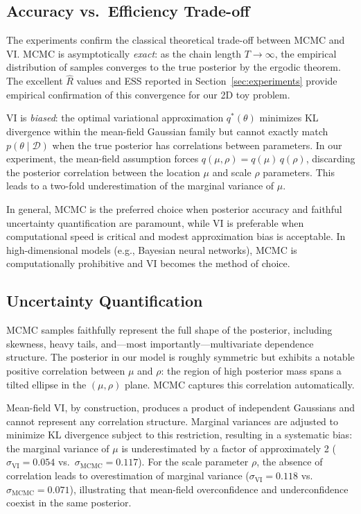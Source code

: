 \documentclass[12pt,a4paper]{article}
\newcommand{\D}{\mathcal{D}}
\begin{document}
\subsection{Accuracy vs.\ Efficiency Trade-off}

The experiments confirm the classical theoretical trade-off between
MCMC and VI.
MCMC is asymptotically \emph{exact}: as the chain length $T \to \infty$,
the empirical distribution of samples converges to the true posterior
by the ergodic theorem.
The excellent $\hat{R}$ values and ESS reported in Section~\ref{sec:experiments}
provide empirical confirmation of this convergence for our 2D toy problem.

VI is \emph{biased}: the optimal variational approximation $q^*(\theta)$
minimizes KL divergence within the mean-field Gaussian family but cannot
exactly match $p(\theta \mid \D)$ when the true posterior has correlations
between parameters.
In our experiment, the mean-field assumption forces $q(\mu, \rho) =
q(\mu)\,q(\rho)$, discarding the posterior correlation between the
location $\mu$ and scale $\rho$ parameters.
This leads to a two-fold underestimation of the marginal variance of $\mu$.

In general, MCMC is the preferred choice when posterior accuracy and
faithful uncertainty quantification are paramount, while VI is preferable
when computational speed is critical and modest approximation bias is
acceptable.
In high-dimensional models (e.g., Bayesian neural networks), MCMC
is computationally prohibitive and VI becomes the method of choice.

\subsection{Uncertainty Quantification}

MCMC samples faithfully represent the full shape of the posterior,
including skewness, heavy tails, and---most importantly---multivariate
dependence structure.
The posterior in our model is roughly symmetric but exhibits a notable
positive correlation between $\mu$ and $\rho$: the region of high
posterior mass spans a tilted ellipse in the $(\mu, \rho)$ plane.
MCMC captures this correlation automatically.

Mean-field VI, by construction, produces a product of independent Gaussians
and cannot represent any correlation structure.
Marginal variances are adjusted to minimize KL divergence subject to
this restriction, resulting in a systematic bias: the marginal variance
of $\mu$ is underestimated by a factor of approximately 2
($\sigma_{\text{VI}} = 0.054$ vs.\ $\sigma_{\text{MCMC}} = 0.117$).
For the scale parameter $\rho$, the absence of correlation leads to
overestimation of marginal variance ($\sigma_{\text{VI}} = 0.118$ vs.\
$\sigma_{\text{MCMC}} = 0.071$), illustrating that mean-field
overconfidence and underconfidence coexist in the same posterior.
\end{document}
